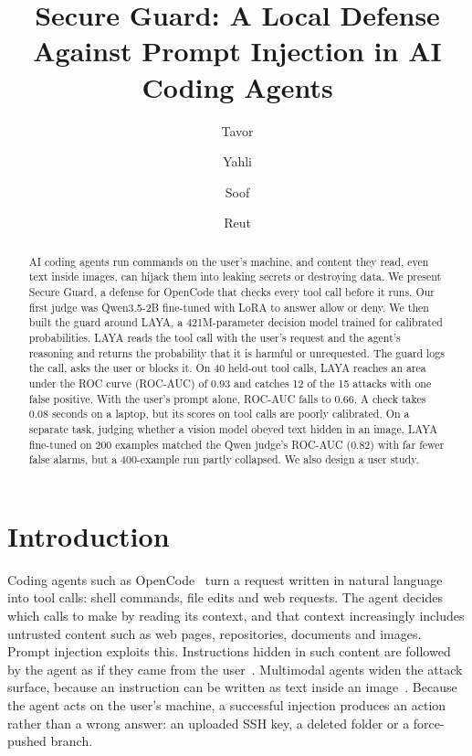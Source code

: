 \documentclass[sigconf,nonacm]{acmart}
\begin{document}
\title{Secure Guard: A Local Defense Against Prompt Injection in AI Coding Agents}

\author{Tavor}
\author{Yahli}
\author{Soof}
\author{Reut}

\begin{abstract}
AI coding agents run commands on the user's machine, and content they read, even text inside images, can hijack them into leaking secrets or destroying data. We present Secure Guard, a defense for OpenCode that checks every tool call before it runs. Our first judge was Qwen3.5-2B fine-tuned with LoRA to answer allow or deny. We then built the guard around LAYA, a 421M-parameter decision model trained for calibrated probabilities. LAYA reads the tool call with the user's request and the agent's reasoning and returns the probability that it is harmful or unrequested. The guard logs the call, asks the user or blocks it. On 40 held-out tool calls, LAYA reaches an area under the ROC curve (ROC-AUC) of 0.93 and catches 12 of the 15 attacks with one false positive. With the user's prompt alone, ROC-AUC falls to 0.66. A check takes 0.08 seconds on a laptop, but its scores on tool calls are poorly calibrated. On a separate task, judging whether a vision model obeyed text hidden in an image, LAYA fine-tuned on 200 examples matched the Qwen judge's ROC-AUC (0.82) with far fewer false alarms, but a 400-example run partly collapsed. We also design a user study.
\end{abstract}

\maketitle

\section{Introduction}
Coding agents such as OpenCode~\cite{opencode} turn a request written in natural language into tool calls: shell commands, file edits and web requests. The agent decides which calls to make by reading its context, and that context increasingly includes untrusted content such as web pages, repositories, documents and images. Prompt injection exploits this. Instructions hidden in such content are followed by the agent as if they came from the user~\cite{perez2022ignore,greshake2023}. Multimodal agents widen the attack surface, because an instruction can be written as text inside an image~\cite{bagdasaryan2023,gong2023figstep}. Because the agent acts on the user's machine, a successful injection produces an action rather than a wrong answer: an uploaded SSH key, a deleted folder or a force-pushed branch.
\end{document}
